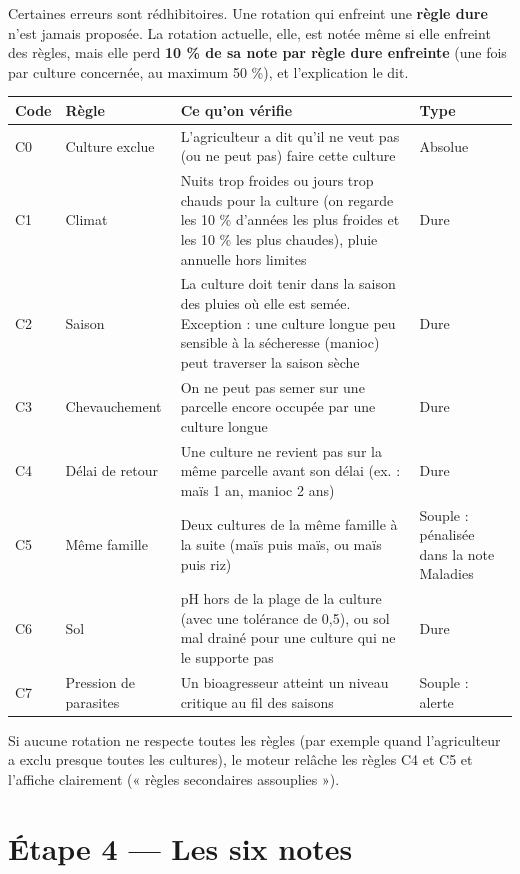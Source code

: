 \documentclass[11pt,a4paper]{article}
\begin{document}
Certaines erreurs sont rédhibitoires. Une rotation qui enfreint une \textbf{règle dure} n'est jamais proposée.
La rotation actuelle, elle, est notée même si elle enfreint des règles, mais elle perd \textbf{10 \% de sa note par
règle dure enfreinte} (une fois par culture concernée, au maximum 50 \%), et l'explication le dit.

\begin{center}
\begin{tabularx}{\textwidth}{L{1cm}L{3.4cm}YL{1.6cm}}
\toprule
\textbf{Code} & \textbf{Règle} & \textbf{Ce qu'on vérifie} & \textbf{Type} \\
\midrule
C0 & Culture exclue & L'agriculteur a dit qu'il ne veut pas (ou ne peut pas) faire cette culture & Absolue \\
C1 & Climat & Nuits trop froides ou jours trop chauds pour la culture (on regarde les 10 \% d'années les plus froides et les 10 \% les plus chaudes), pluie annuelle hors limites & Dure \\
C2 & Saison & La culture doit tenir dans la saison des pluies où elle est semée. Exception : une culture longue peu sensible à la sécheresse (manioc) peut traverser la saison sèche & Dure \\
C3 & Chevauchement & On ne peut pas semer sur une parcelle encore occupée par une culture longue & Dure \\
C4 & Délai de retour & Une culture ne revient pas sur la même parcelle avant son délai (ex. : maïs 1 an, manioc 2 ans) & Dure \\
C5 & Même famille & Deux cultures de la même famille à la suite (maïs puis maïs, ou maïs puis riz) & Souple : pénalisée dans la note Maladies \\
C6 & Sol & pH hors de la plage de la culture (avec une tolérance de 0,5), ou sol mal drainé pour une culture qui ne le supporte pas & Dure \\
C7 & Pression de parasites & Un bioagresseur atteint un niveau critique au fil des saisons & Souple : alerte \\
\bottomrule
\end{tabularx}
\end{center}

Si aucune rotation ne respecte toutes les règles (par exemple quand l'agriculteur a exclu presque toutes les
cultures), le moteur relâche les règles C4 et C5 et l'affiche clairement (« règles secondaires assouplies »).

\section{Étape 4 — Les six notes}
\end{document}
